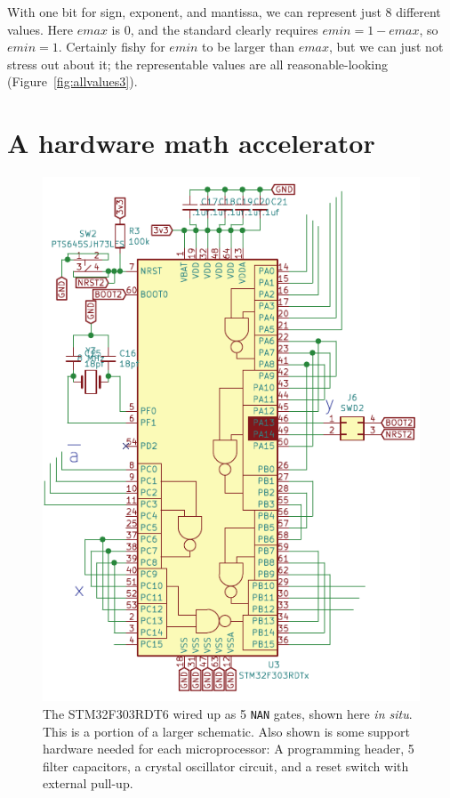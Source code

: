 \documentclass[twocolumn,cm]{article}
\begin{document}
With one bit for sign, exponent, and mantissa, we can represent just 8
different values. Here $emax$ is $0$, and the standard clearly
requires $emin = 1 - emax$, so $emin = 1$. Certainly fishy for $emin$
to be larger than $emax$, but we can just not stress out about it; the
representable values are all reasonable-looking
(Figure~\ref{fig:allvalues3}).

\section{A hardware math accelerator} \label{sec:hardware}

\begin{figure}[ht]
  \begin{center}
    \includegraphics[width=0.95 \linewidth]{chip}
  \caption{The STM32F303RDT6 wired up as 5 {\tt NAN} gates, shown here
    {\it in situ}. This is a portion of a larger schematic.
    Also shown is some support hardware needed for each microprocessor:
    A programming header, 5 filter capacitors, a crystal oscillator circuit,
    and a reset switch with external pull-up.
  }
  \label{fig:schematic}
  \end{center}
\end{figure}
\end{document}
